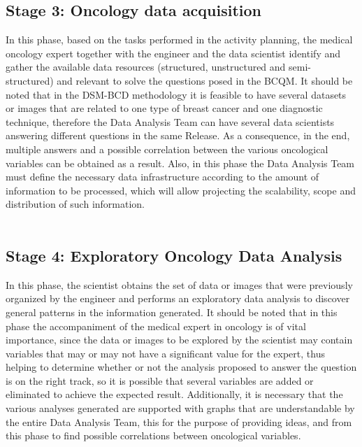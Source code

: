 \subsection*{Stage 3: Oncology data acquisition }
In this phase, based on the tasks performed in the activity planning, the medical oncology expert together with the engineer and the data scientist identify and gather the available data resources (structured, unstructured and semi-structured) and relevant to solve the questions posed in the BCQM. It should be noted that in the DSM-BCD methodology it is feasible to have several datasets or images that are related to one type of breast cancer and one diagnostic technique, therefore the Data Analysis Team can have several data scientists answering different questions in the same Release. As a consequence, in the end, multiple answers and a possible correlation between the various oncological variables can be obtained as a result. Also, in this phase the Data Analysis Team must define the necessary data infrastructure according to the amount of information to be processed, which will allow projecting the scalability, scope and distribution of such information. \\ \\

\subsection*{Stage 4: Exploratory Oncology Data Analysis }
In this phase, the scientist obtains the set of data or images that were previously organized by the engineer and performs an exploratory data analysis to discover general patterns in the information generated. It should be noted that in this phase the accompaniment of the medical expert in oncology is of vital importance, since the data or images to be explored by the scientist may contain variables that may or may not have a significant value for the expert, thus helping to determine whether or not the analysis proposed to answer the question is on the right track, so it is possible that several variables are added or eliminated to achieve the expected result. Additionally, it is necessary that the various analyses generated are supported with graphs that are understandable by the entire Data Analysis Team, this for the purpose of providing ideas, and from this phase to find possible correlations between oncological variables.

